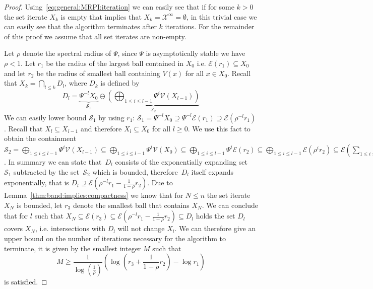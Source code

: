 %
\begin{proof}
Using~\eqref{eq:general:MRPI:iteration} we can easily see that if for some $k>0$
the set iterate $X_k$ is empty that implies that $X_k=\mathcal X^\infty = \emptyset$,
in this trivial case we can easily see that the algorithm terminates after $k$ iterations.
%
For the remainder of this proof we assume that all set iterates are non-empty.

Let $\rho$ denote the spectral radius of $\Psi$, since $\Psi$ is asymptotically
stable we have $\rho<1$.
%
Let $r_1$ be the radius of the largest ball contained in $X_0$ i.e. $\mathcal E(r_1)\subseteq X_0$ 
and let $r_2$ be the radius of smallest ball containing $V(x)$ for all $x\in X_0$.
%
Recall that $X_k = \bigcap_{l\leq k} D_l$, where $D_k$ is defined by
%
\begin{equation}
	D_l = \underbrace{\Psi^{-l} X_0}_{\mathcal S_1} \ominus 
	\underbrace{\left(\bigoplus_{1\leq i\leq l-1} \Psi^{i}\mathcal V(X_{l-1})\right)}_{\mathcal S_2}
\end{equation}
%
We can easily lower bound $\mathcal S_1$ by using $r_1$: $\mathcal S_1 = \Psi^{-l} X_0 
\supseteq \Psi^{-l}\mathcal E(r_1) \supseteq \mathcal E(\rho^{-l} r_1)$.
%
Recall that $X_l\subseteq X_{l-1}$ and therefore $X_l\subseteq X_0$ for all $l\geq0$.
%
We use this fact to obtain the containment $\mathcal S_2 = \bigoplus_{1\leq i\leq l-1} 
\Psi^{i}\mathcal V(X_{l-1})\subseteq \bigoplus_{1\leq i\leq l-1} \Psi^{i}\mathcal V(X_0)\subseteq
\bigoplus_{1\leq i\leq l-1} \Psi^{i}\mathcal E(r_2)\subseteq\bigoplus_{1\leq i\leq l-1} \mathcal E(\rho^{i} r_2)\subseteq
\mathcal E(\sum_{1\leq i\leq l-1}\rho^i r_2)\subseteq \mathcal E(\frac{1}{1-\rho} r_2)$.
%
In summary we can state that~$D_l$ consists of the exponentially expanding set~$\mathcal S_1$
subtracted by the set~$\mathcal S_2$ which is bounded, therefore~$D_l$ itself expands exponentially,
that is $D_l\supseteq\mathcal E(\rho^{-l} r_1 - \frac{1}{1-\rho} r_2)$.
%
Due to Lemma~\ref{thm:band:implies:compactness} we know that for $N\leq n$ the set iterate~$X_N$ is
bounded, let $r_3$ denote the smallest ball that contains $X_N$.
%
We can conclude that for $l$ such that $X_N\subseteq\mathcal E(r_3)\subseteq\mathcal 
E(\rho^{-l} r_1 - \frac{1}{1-\rho} r_2)\subseteq D_l$ holds the set $D_l$ covers
$X_N$, i.e. intersections with $D_l$ will not change $X_l$.
%
We can therefore give an upper bound on the number of iterations necessary for the algorithm
to terminate, it is given by the smallest integer $M$ such that
\begin{equation}\label{bnd:first:lower:bound:on:iteration:count}
	M\geq \frac{1}{\log(\frac{1}{\rho})}\left(\log\left(r_3+\frac{1}{1-\rho}r_2\right)-\log r_1 \right)
\end{equation}
is satisfied.
\end{proof}
